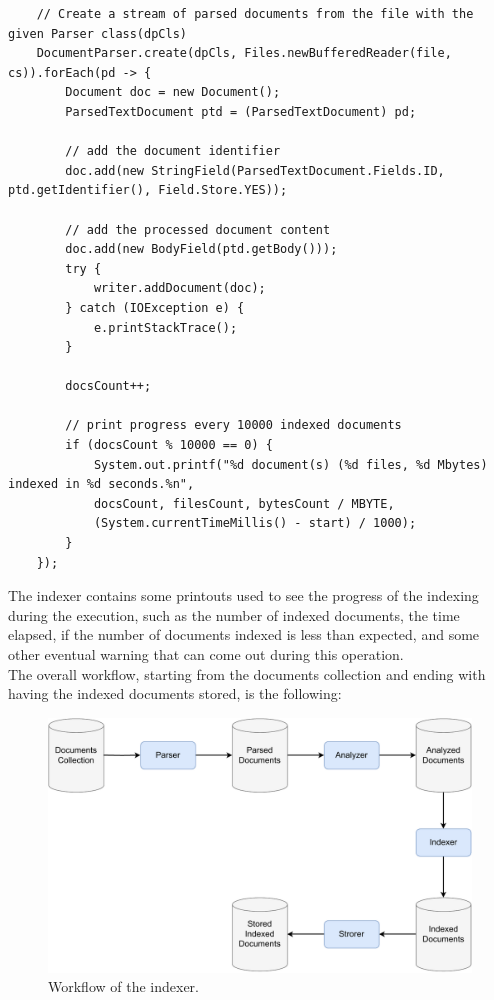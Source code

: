 \begin{lstlisting}
    // Create a stream of parsed documents from the file with the given Parser class(dpCls)
    DocumentParser.create(dpCls, Files.newBufferedReader(file, cs)).forEach(pd -> {
        Document doc = new Document();
        ParsedTextDocument ptd = (ParsedTextDocument) pd;

        // add the document identifier
        doc.add(new StringField(ParsedTextDocument.Fields.ID, ptd.getIdentifier(), Field.Store.YES));

        // add the processed document content
        doc.add(new BodyField(ptd.getBody()));
        try {
            writer.addDocument(doc);
        } catch (IOException e) {
            e.printStackTrace();
        }

        docsCount++;

        // print progress every 10000 indexed documents
        if (docsCount % 10000 == 0) {
            System.out.printf("%d document(s) (%d files, %d Mbytes) indexed in %d seconds.%n",
            docsCount, filesCount, bytesCount / MBYTE,
            (System.currentTimeMillis() - start) / 1000);
        }
    });
\end{lstlisting}

The indexer contains some printouts used to see the progress of the indexing during the execution, such as the number of indexed documents, the time elapsed, if the number of documents indexed is less than expected, and some other eventual warning that can come out during this operation. \\
The overall workflow, starting from the documents collection and ending with having the indexed documents stored, is the following:
\begin{figure}[!h]
    \centering
    \includegraphics[width=0.8\linewidth]{figure/Indexer_workflow.pdf}
    \caption{Workflow of the indexer.}
    \label{fig:Indexer_workflow}
\end{figure}


